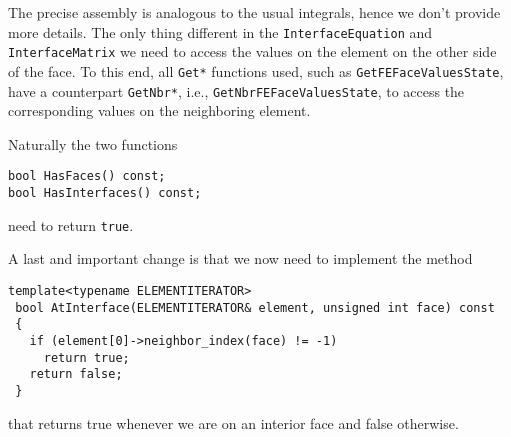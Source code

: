 The precise assembly is analogous to the usual integrals, hence we don't provide more details. The only 
thing different in the \texttt{InterfaceEquation} and \texttt{InterfaceMatrix} we need to access the 
values on the element on the other side of the face. To this end, all \texttt{Get*} functions used, 
such as \texttt{GetFEFaceValuesState},
have a counterpart \texttt{GetNbr*}, i.e., \texttt{GetNbrFEFaceValuesState}, to access the corresponding values 
on the neighboring element.

Naturally the two functions
\begin{verbatim}
bool HasFaces() const;
bool HasInterfaces() const;
\end{verbatim}
need to return \texttt{true}.

A last and important change is that we now need to implement the 
method 
\begin{verbatim}
template<typename ELEMENTITERATOR>
 bool AtInterface(ELEMENTITERATOR& element, unsigned int face) const
 {
   if (element[0]->neighbor_index(face) != -1) 
     return true;
   return false;
 }
\end{verbatim}
that returns true whenever we are on an interior face and false otherwise.

